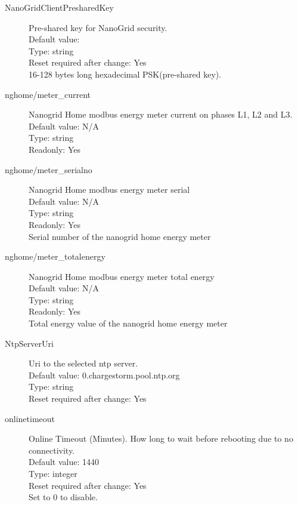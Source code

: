 \begin{description}
\item[NanoGridClientPresharedKey] Pre-shared key for NanoGrid security.\\
  Default value: \\
  Type: string\\
  Reset required after change: Yes\\
  16-128 bytes long hexadecimal PSK(pre-shared key).\\

\item[nghome/meter\_current] Nanogrid Home modbus energy meter current on phases L1, L2 and L3.\\
  Default value: N/A\\
  Type: string\\
  Readonly: Yes\\

\item[nghome/meter\_serialno] Nanogrid Home modbus energy meter serial\\
  Default value: N/A\\
  Type: string\\
  Readonly: Yes\\
  Serial number of the nanogrid home energy meter\\

\item[nghome/meter\_totalenergy] Nanogrid Home modbus energy meter total energy\\
  Default value: N/A\\
  Type: string\\
  Readonly: Yes\\
  Total energy value of the nanogrid home energy meter\\

\item[NtpServerUri] Uri to the selected ntp server.\\
  Default value: 0.chargestorm.pool.ntp.org\\
  Type: string\\
  Reset required after change: Yes\\

\item[onlinetimeout] Online Timeout (Minutes). How long to wait before rebooting due to no connectivity.\\
  Default value: 1440\\
  Type: integer\\
  Reset required after change: Yes\\
  Set to 0 to disable.\\


\end{description}
